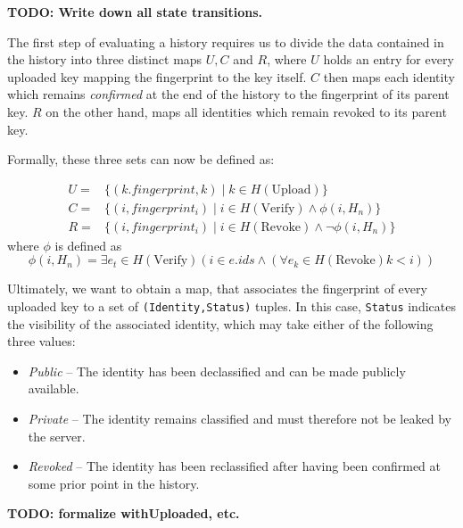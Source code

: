 \textbf{TODO: Write down all state transitions.}


The first step of evaluating a history requires us to divide the data contained in the history into three distinct maps \(U,C\) and \(R\), where \(U\) holds an entry for every uploaded key mapping the fingerprint to the key itself. \(C\) then maps each identity which remains \emph{confirmed} at the end of the history to the fingerprint of its parent key. \(R\) on the other hand, maps all identities which remain revoked to its parent key.

Formally, these three sets can now be defined as: 

\begin{equation}
    \begin{aligned}
        U =& \{(k.fingerprint,k)  \mid k \in H(\text{Upload}) \} \\
        C =& \{(i, fingerprint_i) \mid i \in H(\text{Verify}) \wedge \phi(i, H_n) \} \\
        R =& \{(i, fingerprint_i) \mid i \in H(\text{Revoke}) \wedge \neg \phi(i,H_n)\}
    \end{aligned}
\end{equation}
   where \(\phi\) is defined as 
\begin{equation}
    \phi(i,H_n) = \exists e_t\in H(\text{Verify}) ( i \in e.ids \wedge (\forall e_k \in H(\text{Revoke}) k < i  ))
\end{equation}
 
Ultimately, we want to obtain a map, that associates the fingerprint of every uploaded key to a set of \texttt{(Identity,Status)} tuples. In this case, \texttt{Status} indicates the visibility of the associated identity, which may take either of the following three values: 
\begin{itemize}
    \item \emph{Public} -- The identity has been declassified and can be made publicly available.
    \item \emph{Private} -- The identity remains classified and must therefore not be leaked by the server.
    \item \emph{Revoked} -- The identity has been reclassified after having been confirmed at some prior point in the history.
\end{itemize}

\textbf{TODO: formalize withUploaded, etc. }

